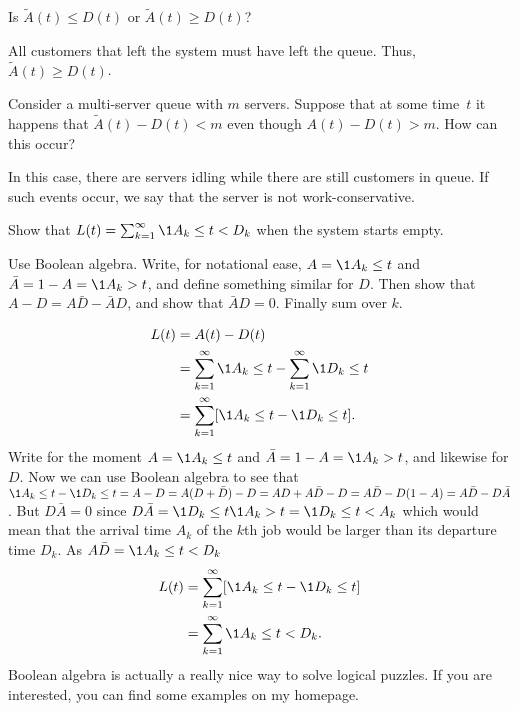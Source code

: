 \begin{extra}
 Is $\tilde A(t) \leq D(t)$ or $\tilde A(t) \geq D(t)$?
\begin{solution}
 All customers that left the system must have left the
 queue. Thus, $\tilde A(t) \geq D(t)$.
\end{solution}
\end{extra}



\begin{extra}
 Consider a multi-server queue with $m$ servers.
 Suppose that at some time~$t$ it happens that $\tilde A(t) - D(t) < m$ even though $A(t) - D(t) > m$.
 How can this occur?
\begin{solution}
 In this case, there are servers idling while there are still
 customers in queue. If such events occur, we say that the server
 is not work-conservative.
\end{solution}
\end{extra}


\begin{exercise}
 Show that $L(t) = \sum_{k=1}^\infty \1{A_k \leq t < D_k}$ when the system starts empty.
\begin{hint}
 Use Boolean algebra.
 Write, for notational ease, $A=\1{A_k \leq t}$ and $\bar A = 1- A = \1{A_k > t}$, and define something similar for $D$.
 Then show that $A - D = A \bar D - \bar A D$, and show that $\bar A D =0$.
 Finally sum over $k$.
\end{hint}

\begin{solution}
 \begin{equation*}
 \begin{split}
 L(t)
&= A(t) - D(t) \\
&= \sum_{k=1}^\infty \1{A_k \leq t} - \sum_{k=1}^\infty \1{D_k \leq t} \\
&= \sum_{k=1}^\infty [\1{A_k \leq t} - \1{D_k \leq t}].
 \end{split}
 \end{equation*}
 Write for the moment $A=\1{A_k \leq t}$ and
 $\bar A = 1- A = \1{A_k > t}$, and likewise for $D$. Now we can use
 Boolean algebra to see that
 $\1{A_k \leq t} - \1{D_k \leq t} = A-D = A(D+\bar D) -D = AD +
 A\bar D - D = A\bar D - D(1-A) = A\bar D - D \bar A$.
 But $D \bar A = 0$ since
 $D \bar A = \1{D_k \leq t} \1{A_k > t} = \1{D_k \leq t < A_k}$
 which would mean that the arrival time $A_k$ of the $k$th job would
 be larger than its departure time $D_k$. As $A \bar D = \1{A_k \leq t < D_k}$
 \begin{equation*}
 \begin{split}
 L(t)
&= \sum_{k=1}^\infty [\1{A_k \leq t} - \1{D_k \leq t}] \\
&= \sum_{k=1}^\infty \1{A_k \leq t < D_k}.
 \end{split}
 \end{equation*}
 Boolean algebra is actually a really nice way to solve logical puzzles.
 If you are interested, you can find some examples on my homepage.
\end{solution}

\end{exercise}

